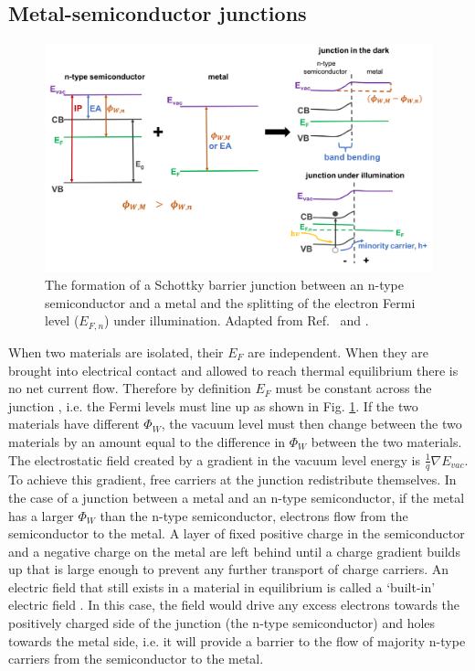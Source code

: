 \documentclass[11pt, twoside]{report}
\begin{document}
\subsection{Metal-semiconductor junctions}
\begin{figure}[h!]
  \centering
    \includegraphics[width=1.0\textwidth]{figures/schottky_schematic.png}
    \caption[The formation of a Schottky barrier junction between an n-type semiconductor and a metal and the splitting of the electron Fermi level ($E_{F,n}$) under illumination]{The formation of a Schottky barrier junction between an n-type semiconductor and a metal and the splitting of the electron Fermi level ($E_{F,n}$) under illumination. Adapted from Ref.~ and .}
  \label{schottky_schematic}
\end{figure}

When two materials are isolated, their $E_F$ are independent. When they are brought into electrical contact and allowed to reach thermal equilibrium there is no net current flow. Therefore by definition $E_F$ must be constant across the junction \cite{PV_bands_book}, i.e. the Fermi levels must line up as shown in Fig. \ref{schottky_schematic}. 
If the two materials have different $\Phi_W$, the vacuum level must then change between the two materials by an amount equal to the difference in $\Phi_W$ between the two materials. The electrostatic field created by a gradient in the vacuum level energy is $\frac{1}{q} \nabla E_{vac}$.
To achieve this gradient, free carriers at the junction redistribute themselves. In the case of a junction between a metal and an n-type semiconductor, if the metal has a larger $\Phi_W$ than the n-type semiconductor, electrons flow from the semiconductor to the metal. A layer of fixed positive charge in the semiconductor and a negative charge on the metal are left behind until a charge gradient builds up that is large enough to prevent any further transport of charge carriers. An electric field that still exists in a material in equilibrium is called a `built-in' electric field \cite{Nelson5}. In this case, the field would drive any excess electrons towards the positively charged side of the junction (the n-type semiconductor) and holes towards the metal side, i.e. it will provide a barrier to the flow of majority n-type carriers from the semiconductor to the metal.
\end{document}
